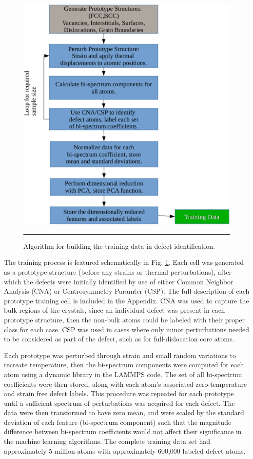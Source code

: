 \documentclass[12pt]{iopart}
\begin{document}
\begin{figure}[htbp]
  \centering
    \includegraphics[scale=0.35]{Figures/cropped_feature_gen.eps}
    \rule{35em}{0.5pt}
  \caption[]{Algorithm for building the training data in defect identification.}
  \label{fig:training}
\end{figure}

The training process is featured schematically in Fig. \ref{fig:training}. Each cell was generated as a prototype structure (before any strains or thermal perturbations), after which the defects were initially identified by use of either Common Neighbor Analysis (CNA)\cite{Stukowski2012} or Centrosymmetry Paramter (CSP)\cite{Kelchner1998}. The full description of each prototype training cell is included in the Appendix. CNA was used to capture the bulk regions of the crystals, since an individual defect was present in each prototype structure, then the non-bulk atoms could be labeled with their proper class for each case. CSP was used in cases where only minor perturbations needed to be considered as part of the defect, such as for full-dislocation core atoms. 

Each prototype was perturbed through strain and small random variations to recreate temperature, then the bi-spectrum components were computed for each atom using a dynamic library in the LAMMPS \cite{Plimpton1995} code. The set of all bi-spectrum coefficients were then stored, along with each atom's associated zero-temperature and strain free defect labels. This procedure was repeated for each prototype until a sufficient spectrum of perturbations was acquired for each defect. The data were then transformed to have zero mean, and were scaled by the standard deviation of each feature (bi-spectrum component) such that the magnitude difference between bi-spectrum coefficients would not affect their significance in the machine learning algorithms. The complete training data set had approximately 5 million atoms with approximately 600,000 labeled defect atoms.
\end{document}
